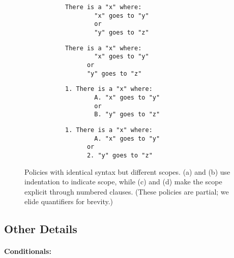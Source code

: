 \begin{figure}[H]
  \begin{subfigure}[b]{0.5\columnwidth}
    \begin{subfigure}[b]{\textwidth}
    \begin{lstlisting}[language=CNL]
      There is a "x" where:
        "x" goes to "y"
        or
        "y" goes to "z"
    \end{lstlisting}
    \caption{}
    \end{subfigure}
    \begin{subfigure}[b]{\textwidth}
    \begin{lstlisting}[language=CNL]
      There is a "x" where:
        "x" goes to "y"
      or
      "y" goes to "z"
    \end{lstlisting}
    \caption{}
    \end{subfigure}
  \end{subfigure}
  \begin{subfigure}[b]{0.5\columnwidth}
    \begin{subfigure}[b]{\textwidth}
    \begin{lstlisting}[language=CNL]
      1. There is a "x" where:
        A. "x" goes to "y"
        or
        B. "y" goes to "z"
    \end{lstlisting}
    \caption{}
    \end{subfigure}
    \begin{subfigure}[b]{\textwidth}
    \begin{lstlisting}[language=CNL]
      1. There is a "x" where:
        A. "x" goes to "y"
      or
      2. "y" goes to "z"
      \end{lstlisting}
      \caption{}
    \end{subfigure}
    \end{subfigure}
    \caption{Policies with identical syntax but different scopes.
    (a) and (b) use indentation to indicate scope, 
    while (c) and (d) make the scope explicit through numbered clauses.
    (These policies are partial; we elide quantifiers for brevity.)}
\label{f:indentation}
\end{figure}


\subsection{Other Details}

\paragraph{Conditionals: }

